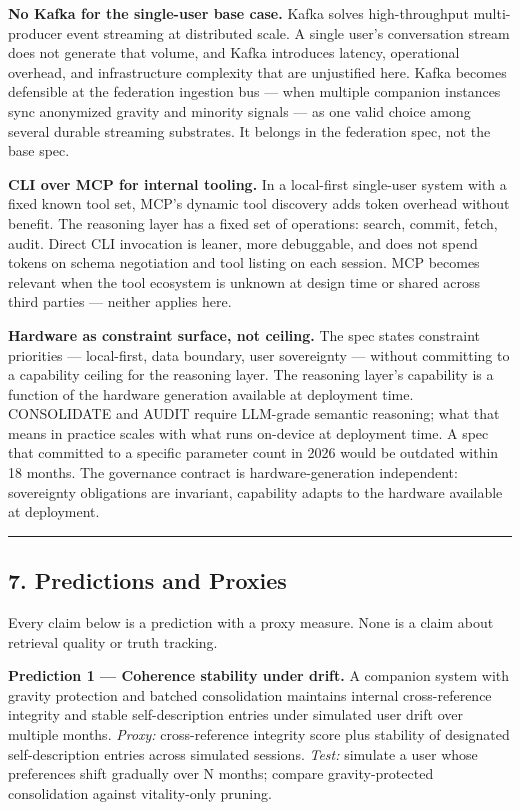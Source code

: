 \documentclass[
  11pt,
]{article}
\begin{document}
\textbf{No Kafka for the single-user base case.} Kafka solves
high-throughput multi-producer event streaming at distributed scale. A
single user's conversation stream does not generate that volume, and
Kafka introduces latency, operational overhead, and infrastructure
complexity that are unjustified here. Kafka becomes defensible at the
federation ingestion bus --- when multiple companion instances sync
anonymized gravity and minority signals --- as one valid choice among
several durable streaming substrates. It belongs in the federation spec,
not the base spec.

\textbf{CLI over MCP for internal tooling.} In a local-first single-user
system with a fixed known tool set, MCP's dynamic tool discovery adds
token overhead without benefit. The reasoning layer has a fixed set of
operations: search, commit, fetch, audit. Direct CLI invocation is
leaner, more debuggable, and does not spend tokens on schema negotiation
and tool listing on each session. MCP becomes relevant when the tool
ecosystem is unknown at design time or shared across third parties ---
neither applies here.

\textbf{Hardware as constraint surface, not ceiling.} The spec states
constraint priorities --- local-first, data boundary, user sovereignty
--- without committing to a capability ceiling for the reasoning layer.
The reasoning layer's capability is a function of the hardware
generation available at deployment time. CONSOLIDATE and AUDIT require
LLM-grade semantic reasoning; what that means in practice scales with
what runs on-device at deployment time. A spec that committed to a
specific parameter count in 2026 would be outdated within 18 months. The
governance contract is hardware-generation independent: sovereignty
obligations are invariant, capability adapts to the hardware available
at deployment.

\begin{center}\rule{0.5\linewidth}{0.5pt}\end{center}

\hypertarget{predictions-and-proxies}{%
\subsection{7. Predictions and Proxies}\label{predictions-and-proxies}}

Every claim below is a prediction with a proxy measure. None is a claim
about retrieval quality or truth tracking.

\textbf{Prediction 1 --- Coherence stability under drift.} A companion
system with gravity protection and batched consolidation maintains
internal cross-reference integrity and stable self-description entries
under simulated user drift over multiple months. \emph{Proxy:}
cross-reference integrity score plus stability of designated
self-description entries across simulated sessions. \emph{Test:}
simulate a user whose preferences shift gradually over N months; compare
gravity-protected consolidation against vitality-only pruning.
\end{document}

